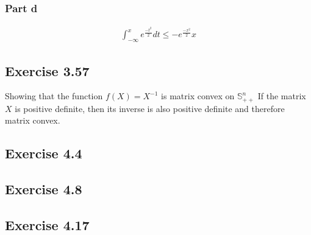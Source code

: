 \subsubsection{Part d}
\begin{gather}
  \int_{-\infty}^{x} e^\frac{-t^2}{2}dt \leq -e^\frac{-x^2}{2}x 
\end{gather}

\subsection{Exercise 3.57}
Showing that the function $f(X) = X^{-1} $ is matrix convex on $\mathbb{S}_{++}^n$
If the matrix $X$ is positive definite, then its inverse is also positive definite and therefore matrix convex.
\subsection{Exercise 4.4}

\subsection{Exercise 4.8}

\subsection{Exercise 4.17}
